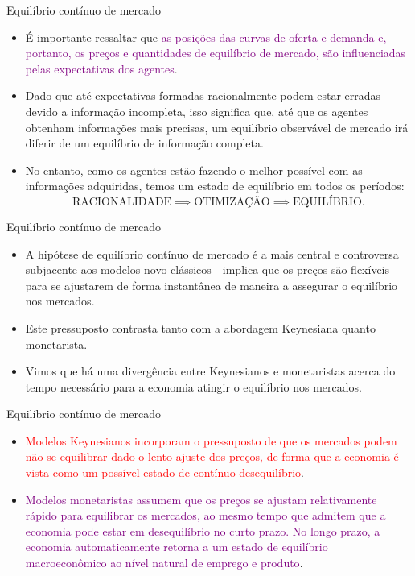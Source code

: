 \documentclass[10pt]{beamer}
\begin{document}
\begin{frame}{Equilíbrio contínuo de mercado}
    \begin{itemize}
        \item É importante ressaltar que \textcolor{purple}{as posições das curvas de oferta e demanda e, portanto, os preços e quantidades de equilíbrio de mercado, são influenciadas pelas expectativas dos agentes}.
        \bigskip
        \item Dado que até expectativas formadas racionalmente podem estar erradas devido a informação incompleta, isso significa que, até que os agentes obtenham informações mais precisas, um equilíbrio observável de mercado irá diferir de um equilíbrio de informação completa.
        \bigskip
        \item No entanto, como os agentes estão fazendo o melhor possível com as informações adquiridas, temos um estado de equilíbrio em todos os períodos:
        \[
        \text{RACIONALIDADE} \implies \text{OTIMIZAÇÃO} \implies \text{EQUILÍBRIO}.
        \]
    \end{itemize}
\end{frame}

\begin{frame}{Equilíbrio contínuo de mercado}
    \begin{itemize}
        \item A hipótese de equilíbrio contínuo de mercado é a mais central e controversa subjacente aos modelos novo-clássicos - implica que os preços são flexíveis para se ajustarem de forma instantânea de maneira a assegurar o equilíbrio nos mercados.
        \bigskip
        \item Este pressuposto contrasta tanto com a abordagem Keynesiana quanto monetarista.
        \bigskip
        \item Vimos que há uma divergência entre Keynesianos e monetaristas acerca do tempo necessário para a economia atingir o equilíbrio nos mercados.
    \end{itemize}
\end{frame}

\begin{frame}{Equilíbrio contínuo de mercado}
    \begin{itemize}
        \item \textcolor{red}{Modelos Keynesianos incorporam o pressuposto de que os mercados podem não se equilibrar dado o lento ajuste dos preços, de forma que a economia é vista como um possível estado de contínuo desequilíbrio}.
        \bigskip
        \item \textcolor{purple}{Modelos monetaristas assumem que os preços se ajustam relativamente rápido para equilibrar os mercados, ao mesmo tempo que admitem que a economia pode estar em desequilíbrio no curto prazo. No longo prazo, a economia automaticamente retorna a um estado de equilíbrio macroeconômico ao nível natural de emprego e produto}.
    \end{itemize}
\end{frame}
\end{document}
